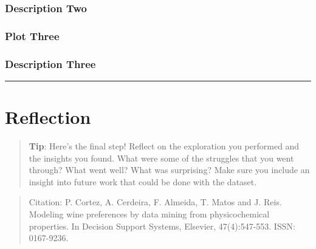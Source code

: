\documentclass[]{article}
\begin{document}
\hypertarget{description-two}{%
\subsubsection{Description Two}\label{description-two}}

\hypertarget{plot-three}{%
\subsubsection{Plot Three}\label{plot-three}}

\hypertarget{description-three}{%
\subsubsection{Description Three}\label{description-three}}

\begin{center}\rule{0.5\linewidth}{\linethickness}\end{center}

\hypertarget{reflection}{%
\section{Reflection}\label{reflection}}

\begin{quote}
\textbf{Tip}: Here's the final step! Reflect on the exploration you
performed and the insights you found. What were some of the struggles
that you went through? What went well? What was surprising? Make sure
you include an insight into future work that could be done with the
dataset.
\end{quote}

\begin{quote}
Citation: P. Cortez, A. Cerdeira, F. Almeida, T. Matos and J. Reis.
Modeling wine preferences by data mining from physicochemical
properties. In Decision Support Systems, Elsevier, 47(4):547-553. ISSN:
0167-9236.
\end{quote}
\end{document}
